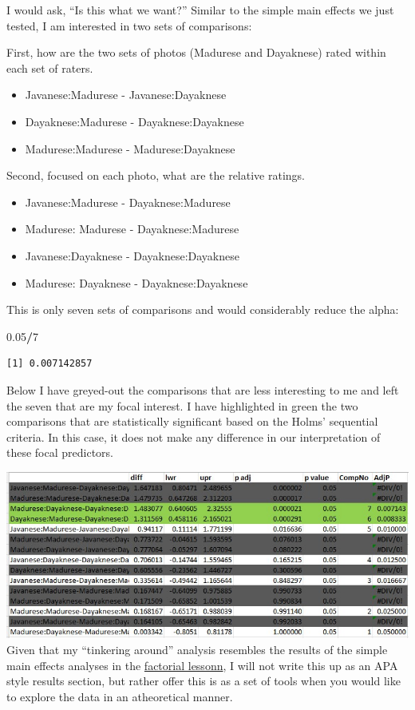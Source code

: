 \documentclass[
  11pt,
]{book}
\newenvironment{Shaded}{\begin{snugshade}}{\end{snugshade}}
\newcommand{\DecValTok}[1]{\textcolor[rgb]{0.06,0.06,0.06}{#1}}
\newcommand{\FloatTok}[1]{\textcolor[rgb]{0.06,0.06,0.06}{#1}}
\newcommand{\SpecialCharTok}[1]{\textcolor[rgb]{0.43,0.43,0.43}{\textbf{#1}}}
\providecommand{\tightlist}{%
  \setlength{\itemsep}{0pt}\setlength{\parskip}{0pt}}
\begin{document}
I would ask, ``Is this what we want?'' Similar to the simple main effects we just tested, I am interested in two sets of comparisons:

First, how are the two sets of photos (Madurese and Dayaknese) rated within each set of raters.

\begin{itemize}
\tightlist
\item
  Javanese:Madurese - Javanese:Dayaknese
\item
  Dayaknese:Madurese - Dayaknese:Dayaknese
\item
  Madurese:Madurese - Madurese:Dayaknese
\end{itemize}

Second, focused on each photo, what are the relative ratings.

\begin{itemize}
\tightlist
\item
  Javanese:Madurese - Dayaknese:Madurese
\item
  Madurese: Madurese - Dayaknese:Madurese
\item
  Javanese:Dayaknese - Dayaknese:Dayaknese
\item
  Madurese: Dayaknese - Dayaknese:Dayaknese
\end{itemize}

This is only seven sets of comparisons and would considerably reduce the alpha:

\begin{Shaded}
\begin{Highlighting}[]
\FloatTok{0.05}\SpecialCharTok{/}\DecValTok{7}
\end{Highlighting}
\end{Shaded}

\begin{verbatim}
[1] 0.007142857
\end{verbatim}

Below I have greyed-out the comparisons that are less interesting to me and left the seven that are my focal interest. I have highlighted in green the two comparisons that are statistically significant based on the Holms' sequential criteria. In this case, it does not make any difference in our interpretation of these focal predictors.

\includegraphics{images/factorial/HolmsSelect.jpg} Given that my ``tinkering around'' analysis resembles the results of the simple main effects analyses in the \protect\hyperlink{between}{factorial lessonn}, I will not write this up as an APA style results section, but rather offer this is as a set of tools when you would like to explore the data in an atheoretical manner.
\end{document}
